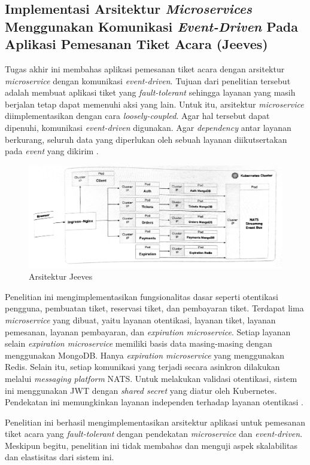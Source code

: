 \subsection{Implementasi Arsitektur \textit{Microservices} Menggunakan Komunikasi \textit{Event-Driven} Pada Aplikasi Pemesanan Tiket Acara (Jeeves)}

Tugas akhir ini membahas aplikasi pemesanan tiket acara dengan arsitektur \textit{microservice} dengan komunikasi \textit{event-driven}. Tujuan dari penelitian tersebut adalah membuat aplikasi tiket yang \textit{fault-tolerant} sehingga layanan yang masih berjalan tetap dapat memenuhi aksi yang lain. Untuk itu, arsitektur \textit{microservice} diimplementasikan dengan cara \textit{loosely-coupled}. Agar hal tersebut dapat dipenuhi, komunikasi \textit{event-driven} digunakan. Agar \textit{dependency} antar layanan berkurang, seluruh data yang diperlukan oleh sebuah layanan diikutsertakan pada \textit{event} yang dikirim \parencite{microservicesEventDriven}.

\begin{figure}[htbp]
    \centering
    \includegraphics[width=1\textwidth]{resources/chapter-2/jeeves.png}
    \caption{Arsitektur Jeeves \parencite{microservicesEventDriven}}
    \label{fig:jeeves-architecture}
\end{figure}

Penelitian ini mengimplementasikan fungsionalitas dasar seperti otentikasi pengguna, pembuatan tiket, reservasi tiket, dan pembayaran tiket. Terdapat lima \textit{microservice} yang dibuat, yaitu layanan otentikasi, layanan tiket, layanan pemesanan, layanan pembayaran, dan \textit{expiration microservice}. Setiap layanan selain \textit{expiration microservice} memiliki basis data masing-masing dengan menggunakan MongoDB. Hanya \textit{expiration microservice} yang menggunakan Redis. Selain itu, setiap komunikasi yang terjadi secara asinkron dilakukan melalui \textit{messaging platform} NATS. Untuk melakukan validasi otentikasi, sistem ini menggunakan JWT dengan \textit{shared secret} yang diatur oleh Kubernetes. Pendekatan ini memungkinkan layanan independen terhadap layanan otentikasi \parencite{microservicesEventDriven}.

Penelitian ini berhasil mengimplementasikan arsitektur aplikasi untuk pemesanan tiket acara yang \textit{fault-tolerant} dengan pendekatan \textit{microservice} dan \textit{event-driven}. Meskipun begitu, penelitian ini tidak membahas dan menguji aspek skalabilitas dan elastisitas dari sistem ini.
